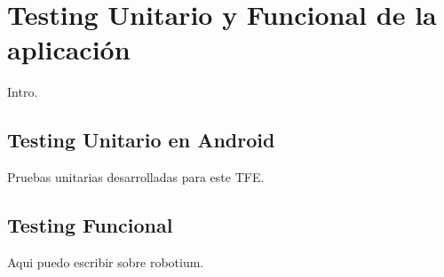 \chapter{Testing Unitario y Funcional de la aplicaci\'on}
\label{sec:testing}

Intro.

\section{Testing Unitario en Android}
\label{sec:testing.android}

Pruebas unitarias desarrolladas para este \ac{TFE}.

\section{Testing Funcional}
\label{sec:testing.functional}

Aqui puedo escribir sobre robotium.



